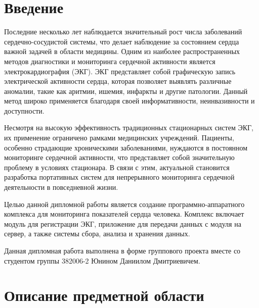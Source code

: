 \documentclass[12pt, russian]{extarticle}
\begin{document}

\begin{spacing}{1.5}

\tableofcontents
\thispagestyle{empty}
\newpage

\pagestyle{plain}
\setcounter{page}{3}

\section{Введение}

Последние несколько лет наблюдается значительный рост числа заболеваний сердечно-сосудистой системы, что делает наблюдение за состоянием сердца важной задачей в области медицины. Одним из наиболее распространенных методов диагностики и мониторинга сердечной активности является электрокардиография (ЭКГ). ЭКГ представляет собой графическую запись электрической активности сердца, которая позволяет выявлять различные аномалии, такие как аритмии, ишемия, инфаркты и другие патологии. Данный метод широко применяется благодаря своей информативности, неинвазивности и доступности.

Несмотря на высокую эффективность традиционных стационарных систем ЭКГ, их применение ограничено рамками медицинских учреждений. Пациенты, особенно страдающие хроническими заболеваниями, нуждаются в постоянном мониторинге сердечной активности, что представляет собой значительную проблему в условиях стационара. В связи с этим, актуальной становится разработка портативных систем для непрерывного мониторинга сердечной деятельности в повседневной жизни.

Целью данной дипломной работы является создание программно-аппаратного комплекса для мониторинга показателей сердца человека. Комплекс включает модуль для регистрации ЭКГ, приложение для передачи данных с модуля на сервер, а также системы сбора, анализа и хранения данных.

Данная дипломная работа выполнена в форме группового проекта вместе со студентом группы 382006-2 Юнином Даниилом Дмитриевичем.

\newpage
\section{Описание предметной области}


\end{spacing}
\end{document}

